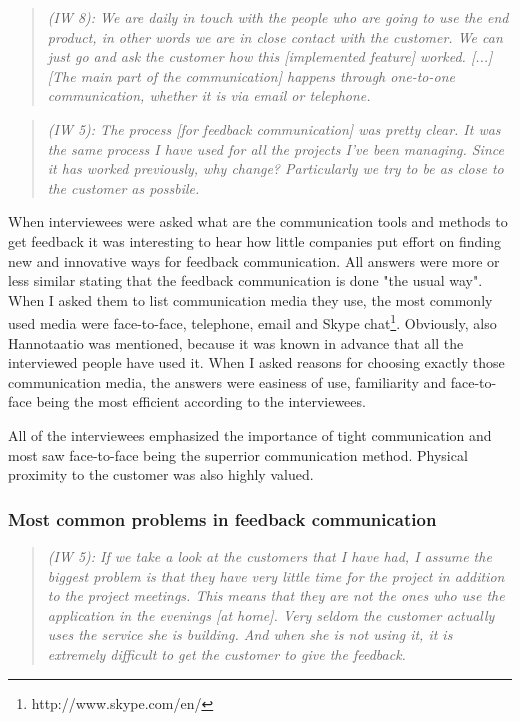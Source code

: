 \documentclass[english,12pt,a4paper,pdftex]{article}
\newcommand{\q}[2]{
\begin{quote}
\emph{(IW #1): #2}
\end{quote}}
\begin{document}

\q{8}{We are daily in touch with the people who are going to use the end product, in other words we are in close contact with the customer. We can just go and ask the customer how this [implemented feature] worked. [...] [The main part of the communication] happens through one-to-one communication, whether it is via email or telephone.}

\q{5}{The process [for feedback communication] was pretty clear. It was the same process I have used for all the projects I've been managing. Since it has worked previously, why change? Particularly we try to be as close to the customer as possbile.}

When interviewees were asked what are the communication tools and methods to get feedback it was interesting to hear how little companies put effort on finding new and innovative ways for feedback communication. All answers were more or less similar stating that the feedback communication is done "the usual way". When I asked them to list communication media they use, the most commonly used media were face-to-face, telephone, email and Skype chat\footnote{http://www.skype.com/en/}. Obviously, also Hannotaatio was mentioned, because it was known in advance that all the interviewed people have used it. When I asked reasons for choosing exactly those communication media, the answers were easiness of use, familiarity and face-to-face being the most efficient according to the interviewees. 

All of the interviewees emphasized the importance of tight communication and most saw face-to-face being the superrior communication method. Physical proximity to the customer was also highly valued.

\subsubsection{Most common problems in feedback communication}

\q{5}{If we take a look at the customers that I have had, I assume the biggest problem is that they have very little time for the project in addition to the project meetings. This means that they are not the ones who use the application in the evenings [at home]. Very seldom the customer actually uses the service she is building. And when she is not using it, it is extremely difficult to get the customer to give the feedback.}
\end{document}

